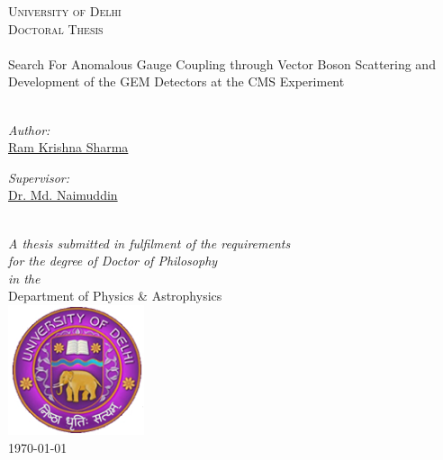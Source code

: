 \begin{titlepage}
\begin{center}

\textsc{\LARGE \color{red!50!black}University of Delhi}\\[1.1cm] %
\textsc{\Large Doctoral Thesis}\\[0.5cm] %

\HRule \\[0.4cm] %
{\huge {}\selectfont Search For Anomalous Gauge Coupling through Vector Boson Scattering and Development of the GEM Detectors at the CMS Experiment}\\[0.4cm] %
\HRule \\[1.5cm] %
 
\begin{minipage}{0.4\textwidth}
\begin{flushleft} \large
\emph{Author:}\\
\href{https://ram1123.github.io/about/}{\color{red!50!black}Ram Krishna Sharma} %
\end{flushleft}
\end{minipage}
\begin{minipage}{0.4\textwidth}
\begin{flushright} \large
\emph{Supervisor:} \\
\href{http://www.du.ac.in/du/uploads/Faculty%20Profiles/2017/Physics/Dec2016_Physics_Naimuddin.pdf}{\color{red!50!black}Dr. Md. Naimuddin} %
\end{flushright}
\end{minipage}\\[2.0cm]
 
\large \textit{A thesis submitted in fulfilment of the requirements\\ for the degree of Doctor of Philosophy}\\[0.3cm] %
\textit{in the}\\[0.3cm]

{\color{red!50!black}Department of Physics \& Astrophysics}\\[0.3cm] %
 
\includegraphics[width=4cm]{figures/logo_du.jpg}\\
{\large \monthyeardate\today}\\ %
 
\vfill
\end{center}

\end{titlepage}
